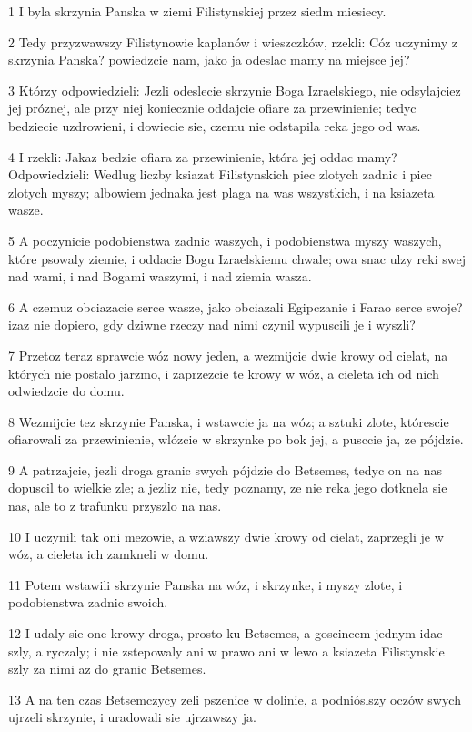 \par 1 I byla skrzynia Panska w ziemi Filistynskiej przez siedm miesiecy.
\par 2 Tedy przyzwawszy Filistynowie kaplanów i wieszczków, rzekli: Cóz uczynimy z skrzynia Panska? powiedzcie nam, jako ja odeslac mamy na miejsce jej?
\par 3 Którzy odpowiedzieli: Jezli odeslecie skrzynie Boga Izraelskiego, nie odsylajciez jej próznej, ale przy niej koniecznie oddajcie ofiare za przewinienie; tedyc bedziecie uzdrowieni, i dowiecie sie, czemu nie odstapila reka jego od was.
\par 4 I rzekli: Jakaz bedzie ofiara za przewinienie, która jej oddac mamy? Odpowiedzieli: Wedlug liczby ksiazat Filistynskich piec zlotych zadnic i piec zlotych myszy; albowiem jednaka jest plaga na was wszystkich, i na ksiazeta wasze.
\par 5 A poczynicie podobienstwa zadnic waszych, i podobienstwa myszy waszych, które psowaly ziemie, i oddacie Bogu Izraelskiemu chwale; owa snac ulzy reki swej nad wami, i nad Bogami waszymi, i nad ziemia wasza.
\par 6 A czemuz obciazacie serce wasze, jako obciazali Egipczanie i Farao serce swoje? izaz nie dopiero, gdy dziwne rzeczy nad nimi czynil wypuscili je i wyszli?
\par 7 Przetoz teraz sprawcie wóz nowy jeden, a wezmijcie dwie krowy od cielat, na których nie postalo jarzmo, i zaprzezcie te krowy w wóz, a cieleta ich od nich odwiedzcie do domu.
\par 8 Wezmijcie tez skrzynie Panska, i wstawcie ja na wóz; a sztuki zlote, którescie ofiarowali za przewinienie, wlózcie w skrzynke po bok jej, a pusccie ja, ze pójdzie.
\par 9 A patrzajcie, jezli droga granic swych pójdzie do Betsemes, tedyc on na nas dopuscil to wielkie zle; a jezliz nie, tedy poznamy, ze nie reka jego dotknela sie nas, ale to z trafunku przyszlo na nas.
\par 10 I uczynili tak oni mezowie, a wziawszy dwie krowy od cielat, zaprzegli je w wóz, a cieleta ich zamkneli w domu.
\par 11 Potem wstawili skrzynie Panska na wóz, i skrzynke, i myszy zlote, i podobienstwa zadnic swoich.
\par 12 I udaly sie one krowy droga, prosto ku Betsemes, a goscincem jednym idac szly, a ryczaly; i nie zstepowaly ani w prawo ani w lewo a ksiazeta Filistynskie szly za nimi az do granic Betsemes.
\par 13 A na ten czas Betsemczycy zeli pszenice w dolinie, a podnióslszy oczów swych ujrzeli skrzynie, i uradowali sie ujrzawszy ja.
